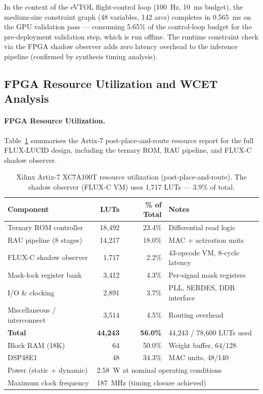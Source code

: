 \documentclass[sigplan,review,anonymous]{acmart}
\begin{document}
In the context of the eVTOL flight-control loop (100~Hz, 10~ms budget),
the medium-size constraint graph (48 variables, 142 arcs) completes in
0.565~ms on the GPU validation pass — consuming 5.65\% of the control-loop
budget for the pre-deployment validation step, which is run offline.
The runtime constraint check via the FPGA shadow observer adds zero latency
overhead to the inference pipeline (confirmed by synthesis timing analysis).

\subsection{FPGA Resource Utilization and WCET Analysis}
\label{sec:eval-fpga}

\paragraph{FPGA Resource Utilization.}
Table~\ref{tab:fpga} summarises the Artix-7 post-place-and-route resource
report for the full FLUX-LUCID design, including the ternary ROM, RAU
pipeline, and FLUX-C shadow observer.

\begin{table}[t]
\centering
\caption{Xilinx Artix-7 XC7A100T resource utilization (post-place-and-route).
The shadow observer (FLUX-C VM) uses 1,717 LUTs — 3.9\% of total.}
\label{tab:fpga}
\renewcommand{\arraystretch}{1.15}
\begin{tabular}{lrrl}
\toprule
\textbf{Component} & \textbf{LUTs} & \textbf{\% of Total} & \textbf{Notes} \\
\midrule
Ternary ROM controller          & 18,492 & 23.4\% & Differential read logic \\
RAU pipeline (8 stages)         & 14,217 & 18.0\% & MAC + activation units \\
FLUX-C shadow observer          & 1,717  & 2.2\%  & 43-opcode VM, 8-cycle latency \\
Mask-lock register bank         & 3,412  & 4.3\%  & Per-signal mask registers \\
I/O \& clocking                 & 2,891  & 3.7\%  & PLL, SERDES, DDR interface \\
Miscellaneous / interconnect    & 3,514  & 4.5\%  & Routing overhead \\
\midrule
\textbf{Total}                  & \textbf{44,243} & \textbf{56.0\%} & 44,243 / 78,600 LUTs used \\
\midrule
Block RAM (18K)                 & 64     & 50.0\% & Weight buffer, 64/128 \\
DSP48E1                         & 48     & 34.3\% & MAC units, 48/140 \\
Power (static + dynamic)        & \multicolumn{3}{l}{2.58~W at nominal operating conditions} \\
Maximum clock frequency         & \multicolumn{3}{l}{187~MHz (timing closure achieved)} \\
\bottomrule
\end{tabular}
\end{table}
\end{document}
